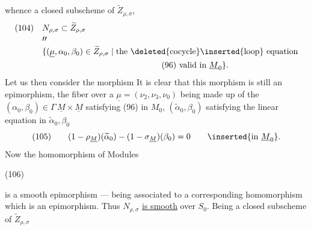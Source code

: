 
whence a closed subscheme of $\widetilde Z_{\rho,\sigma}$,
\[
\begin{aligned}
(104)\quad&N_{\rho,\sigma}\subset\widetilde Z_{\rho,\sigma}\\[-2pt]
&\prime\prime\\[-2pt]
&\{(\underline\mu,\alpha_0,\beta_0)\in\widetilde Z_{\rho,\sigma}\mid
\text{the \deleted{cocycle}\inserted{loop} equation}\\
&\hspace{5cm}\text{(96) valid in }\underline M_0\}.
\end{aligned}
\]
Let us then consider the morphism
It is clear that this morphism is still an epimorphism, the fiber over a
$\underline\mu=(\nu_2,\nu_3,\nu_0)$ being made up of the
$(\alpha_0,\beta_0)\in\Gamma\,\underline M\times\underline M$
satisfying (96) in $M_0$,
$(\widetilde\alpha_0,\beta_0)$ satisfying the linear equation
in $\widetilde\alpha_0,\beta_0$
\[
(105)\qquad
(1-\rho_{\underline M})(\widetilde\alpha_0)
-(1-\sigma_{\underline M})(\beta_0)=0
\qquad\inserted{\text{in }\underline M_0}.
\]
Now the homomorphism of Modules

\begin{samepage}
(106)
\end{samepage}
is a smooth epimorphism --- being associated to a corresponding homomorphism
which is  an epimorphism.
Thus  $N_{\rho,\sigma}$ \uline{is smooth} over $S_0$.
 Being a closed subscheme of $\widetilde Z_{\rho,\sigma}$

